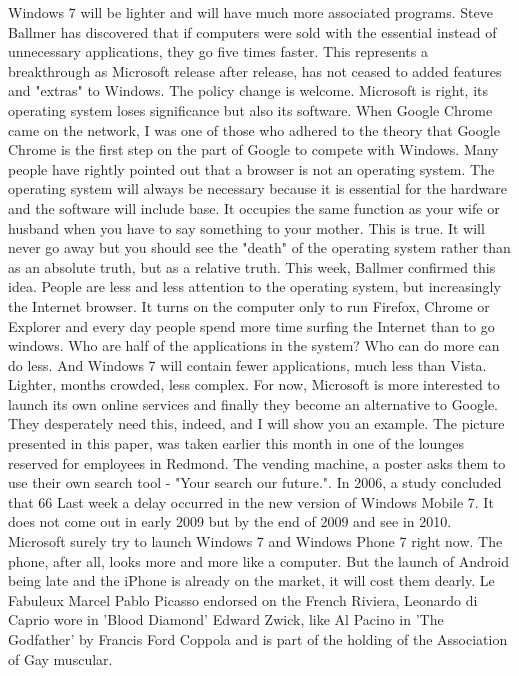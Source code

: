 Windows 7 will be lighter and will have much more associated programs.
Steve Ballmer has discovered that if computers were sold with the essential instead of unnecessary applications, they go five times faster.
This represents a breakthrough as Microsoft release after release, has not ceased to added features and "extras" to Windows.
The policy change is welcome.
Microsoft is right, its operating system loses significance but also its software.
When Google Chrome came on the network, I was one of those who adhered to the theory that Google Chrome is the first step on the part of Google to compete with Windows.
Many people have rightly pointed out that a browser is not an operating system.
The operating system will always be necessary because it is essential for the hardware and the software will include base.
It occupies the same function as your wife or husband when you have to say something to your mother.
This is true.
It will never go away but you should see the "death" of the operating system rather than as an absolute truth, but as a relative truth.
This week, Ballmer confirmed this idea.
People are less and less attention to the operating system, but increasingly the Internet browser.
It turns on the computer only to run Firefox, Chrome or Explorer and every day people spend more time surfing the Internet than to go windows.
Who are half of the applications in the system?
Who can do more can do less.
And Windows 7 will contain fewer applications, much less than Vista.
Lighter, months crowded, less complex.
For now, Microsoft is more interested to launch its own online services and finally they become an alternative to Google.
They desperately need this, indeed, and I will show you an example.
The picture presented in this paper, was taken earlier this month in one of the lounges reserved for employees in Redmond.
The vending machine, a poster asks them to use their own search tool - "Your search our future.".
In 2006, a study concluded that 66%
Last week a delay occurred in the new version of Windows Mobile 7.
It does not come out in early 2009 but by the end of 2009 and see in 2010.
Microsoft surely try to launch Windows 7 and Windows Phone 7 right now.
The phone, after all, looks more and more like a computer.
But the launch of Android being late and the iPhone is already on the market, it will cost them dearly.
Le Fabuleux Marcel
Pablo Picasso endorsed on the French Riviera, Leonardo di Caprio wore in 'Blood Diamond' Edward Zwick, like Al Pacino in 'The Godfather' by Francis Ford Coppola and is part of the holding of the Association of Gay muscular.
